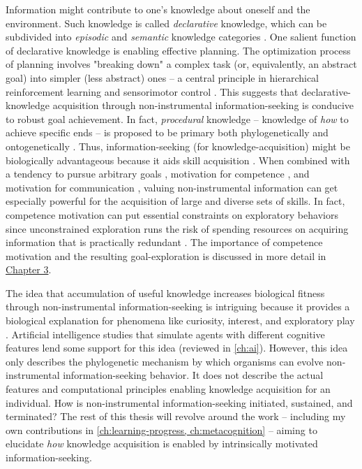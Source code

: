 Information might contribute to one's knowledge about oneself and the environment. Such knowledge is called \emph{declarative} knowledge, which can be subdivided into \emph{episodic} and \emph{semantic} knowledge categories \cite{tulving_episodic_1972}. One salient function of declarative knowledge is enabling effective planning. The optimization process of planning involves "breaking down" a complex task (or, equivalently, an abstract goal) into simpler (less abstract) ones -- a central principle in hierarchical reinforcement learning \cite{pateria_hierarchical_2021} and sensorimotor control \cite{todorov_optimal_2002}. This suggests that declarative-knowledge acquisition through non-instrumental information-seeking is conducive to robust goal achievement. In fact, \emph{procedural} knowledge -- knowledge of \emph{how} to achieve specific ends -- is proposed to be primary both phylogenetically and ontogenetically \cite{ten_berge_procedural_1999}. Thus, information-seeking (for knowledge-acquisition) might be biologically advantageous because it aids skill acquisition \cite{gottlieb_information-seeking_2013}. When combined with a tendency to pursue arbitrary goals \cite{chu_play_2020}, motivation for competence \cite{deci_concept_2005}, and motivation for communication \cite{boyd_evolution_2018}, valuing non-instrumental information can get especially powerful for the acquisition of large and diverse sets of skills. In fact, competence motivation can put essential constraints on exploratory behaviors since unconstrained exploration runs the risk of spending resources on acquiring information that is practically redundant \cite{baldassarre_intrinsically_2013}. The importance of competence motivation and the resulting goal-exploration is discussed in more detail in \hyperref[ch:ai]{Chapter 3}.

The idea that accumulation of useful knowledge increases biological fitness through  non-instrumental information-seeking is intriguing because it provides a biological explanation for phenomena like curiosity, interest, and exploratory play \cite{gottlieb_towards_2018,murayama_process_2019,chu_exploratory_2020}. Artificial intelligence studies that simulate agents with different cognitive features lend some support for this idea (reviewed in \autoref{ch:ai}). However, this idea only describes the phylogenetic mechanism by which organisms can evolve non-instrumental information-seeking behavior. It does not describe the actual features and computational principles enabling knowledge acquisition for an individual. How is non-instrumental information-seeking initiated, sustained, and terminated? The rest of this thesis will revolve around the work -- including my own contributions in \autoref{ch:learning-progress, ch:metacognition} -- aiming to elucidate \emph{how} knowledge acquisition is enabled by intrinsically motivated information-seeking.

